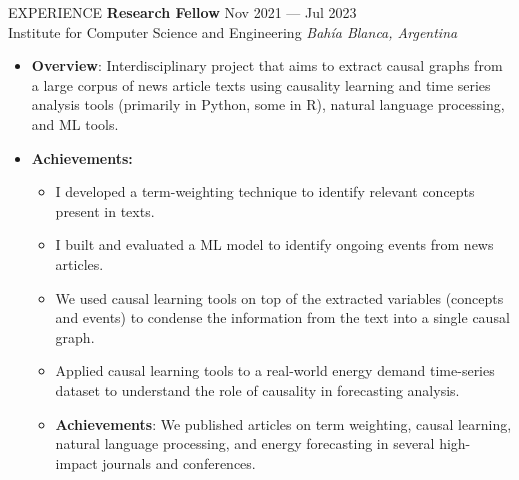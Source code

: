 \documentclass{resume} %
\begin{document}
\begin{rSection}{EXPERIENCE}
\textbf{Research Fellow} \hfill Nov 2021 --- Jul 2023\\
Institute for Computer Science and Engineering \hfill \textit{Bahía Blanca, Argentina}\\
\vspace{-0.7cm}
\begin{itemize}
    \item \textbf{Overview}: Interdisciplinary project that aims to extract causal graphs from a large corpus of news article texts using causality learning and time series analysis tools (primarily in Python, some in R), natural language processing, and ML tools.
    \vspace{-0.25cm}
    \item \textbf{Achievements: }
    \vspace{-0.25cm}
    \begin{itemize}
    \item  I developed a term-weighting technique to identify relevant concepts present in texts.
    \vspace{-0.25cm}
    \item  I built and evaluated a ML model to identify ongoing events from news articles.
    \vspace{-0.25cm}
    \item We used causal learning tools on top of the extracted variables (concepts and events) to condense the information from the text into a single causal graph.
    \vspace{-0.25cm}
    \item Applied causal learning tools to a real-world energy demand time-series dataset to understand the role of causality in forecasting analysis.
    \vspace{-0.25cm}
    \item \textbf{Achievements}: We published articles on term weighting, causal learning, natural language processing, and energy forecasting in several high-impact journals and conferences.
    \end{itemize}
\end{itemize}



\end{rSection}
\end{document}
